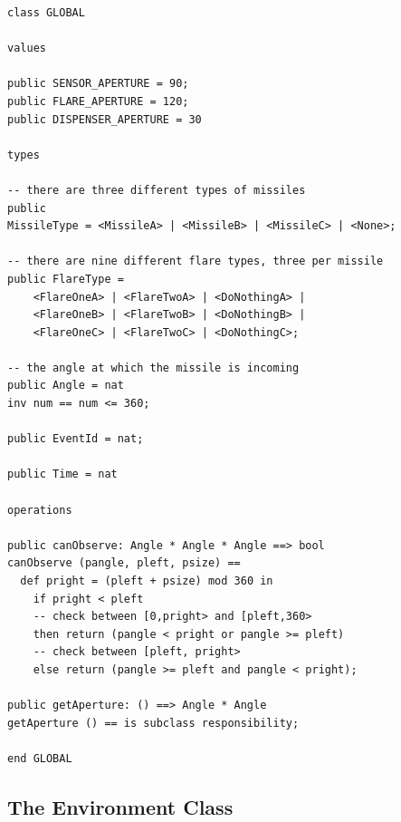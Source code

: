 \documentclass{overturerepchap}
\begin{document}
\begin{lstlisting}
class GLOBAL

values

public SENSOR_APERTURE = 90;
public FLARE_APERTURE = 120;
public DISPENSER_APERTURE = 30

types

-- there are three different types of missiles
public 
MissileType = <MissileA> | <MissileB> | <MissileC> | <None>;

-- there are nine different flare types, three per missile
public FlareType =
    <FlareOneA> | <FlareTwoA> | <DoNothingA> | 
    <FlareOneB> | <FlareTwoB> | <DoNothingB> | 
    <FlareOneC> | <FlareTwoC> | <DoNothingC>;

-- the angle at which the missile is incoming
public Angle = nat
inv num == num <= 360;

public EventId = nat;

public Time = nat

operations

public canObserve: Angle * Angle * Angle ==> bool
canObserve (pangle, pleft, psize) ==
  def pright = (pleft + psize) mod 360 in
    if pright < pleft
    -- check between [0,pright> and [pleft,360>
    then return (pangle < pright or pangle >= pleft)
    -- check between [pleft, pright>
    else return (pangle >= pleft and pangle < pright);
       
public getAperture: () ==> Angle * Angle
getAperture () == is subclass responsibility;

end GLOBAL
\end{lstlisting}

\subsection{The Environment Class}
\end{document}
